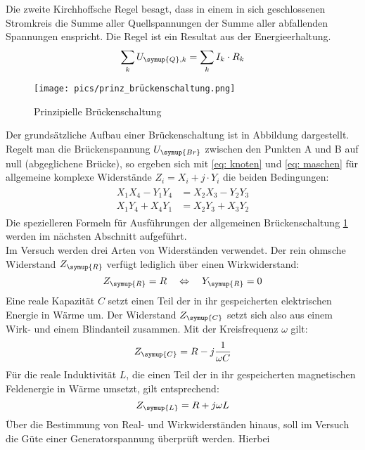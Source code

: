 Die zweite Kirchhoffsche Regel besagt, dass in einem in sich geschlossenen Stromkreis
die Summe aller Quellspannungen der Summe aller abfallenden
Spannungen enspricht. Die Regel ist ein Resultat aus der Energieerhaltung.
\begin{equation}
  \sum_k U_{\symup{Q},k} = \sum_k I_k \cdot R_k
  \label{eq: maschen}
\end{equation}
\begin{figure}
  \centering
  \texttt{[image: pics/prinz\_brückenschaltung.png]}
  \caption{Prinzipielle Brückenschaltung\cite{anleitung302}}
  \label{fig: prinzbrücke}
\end{figure}
Der grundsätzliche Aufbau einer Brückenschaltung ist in Abbildung  dargestellt. Regelt man die Brückenspannung $U_{\symup{Br}}$ %
zwischen den Punkten A und B auf null (abgeglichene Brücke), so ergeben sich mit \eqref{eq: knoten} und \eqref{eq: maschen}
für allgemeine komplexe Widerstände ${Z}_i = X_i + j \cdot Y_i$ die
beiden Bedingungen:
\begin{align}
  \begin{aligned}
    X_1 X_4 - Y_1 Y_4 &= X_2 X_3 - Y_2 Y_3 \\
    X_1 Y_4 + X_4 Y_1 &= X_2 Y_3 + X_3 Y_2
  \end{aligned}
  \label{eq: widerstandsbedingungen}
\end{align}
Die spezielleren Formeln für Ausführungen der allgemeinen Brückenschaltung \ref{fig: prinzbrücke} werden im nächsten Abschnitt aufgeführt.\\
Im Versuch werden drei Arten von Widerständen verwendet. Der rein ohmsche Widerstand
$Z_{\symup{R}}$ verfügt lediglich über einen Wirkwiderstand:
\begin{equation}
 Z_{\symup{R}} = R \quad \Leftrightarrow \quad Y_{\symup{R}} = 0
\end{equation}
Eine reale Kapazität $C$ setzt einen Teil der in ihr gespeicherten elektrischen Energie
in Wärme um. Der Widerstand $Z_{\symup{C}}$ setzt sich also aus einem Wirk- und einem Blindanteil zusammen. Mit der Kreisfrequenz $\omega$ gilt:
\begin{equation}
  Z_{\symup{C}} = R - j \frac{1}{\omega C}
\end{equation}
Für die reale Induktivität $L$, die einen Teil der in ihr
gespeicherten magnetischen Feldenergie in Wärme umsetzt, gilt entsprechend:
\begin{equation}
  Z_{\symup{L}} = R + j \omega L
\end{equation}
Über die Bestimmung von Real- und Wirkwiderständen hinaus, soll im Versuch die Güte einer Generatorspannung überprüft werden. Hierbei
